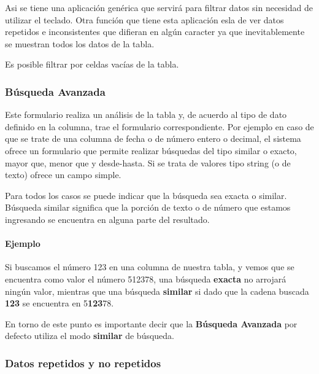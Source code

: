 \documentclass[a4paper,10pt]{article}
\begin{document}
Asi se tiene una aplicación genérica que servirá para filtrar datos sin necesidad de utilizar el teclado. Otra función que tiene esta aplicación esla de ver datos repetidos e inconsistentes que difieran en algún caracter ya que inevitablemente se muestran todos los datos de la tabla.

Es posible filtrar por celdas vacías de la tabla. 


\subsubsection{Búsqueda Avanzada}

Este formulario realiza un análisis de la tabla y, de acuerdo al tipo de dato definido en la columna, trae el formulario correspondiente. Por ejemplo en caso de que se trate de una columna de fecha o de número entero o decimal, el sistema ofrece un formulario que permite realizar búsquedas del tipo similar o exacto, mayor que, menor que y desde-hasta. Si se trata de valores tipo string (o de texto) ofrece un campo simple.

Para todos los casos se puede indicar que la búsqueda sea exacta o similar. Búsqueda similar significa que la porción de texto o de número que estamos ingresando se encuentra en alguna parte del resultado.

\paragraph{Ejemplo} Si buscamos el número 123 en una columna de nuestra tabla, y vemos que se encuentra como valor el número 512378, una búsqueda \textbf{exacta} no arrojará ningún valor, mientras que una búsqueda \textbf{similar} si dado que la cadena buscada \textbf{123} se encuentra en 5\textbf{123}78.

En torno de este punto es importante decir que la \textbf{Búsqueda Avanzada} por defecto utiliza el modo \textbf{similar} de búsqueda.

\subsubsection{Datos repetidos y no repetidos}
\end{document}
